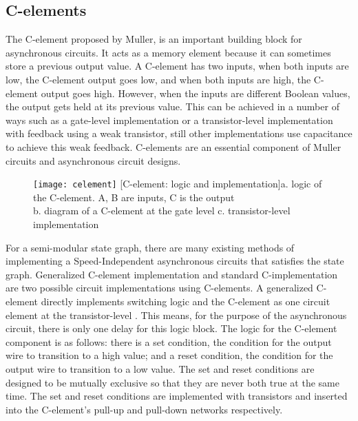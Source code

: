 \documentclass[12pt]{report}
\begin{document}
\subsection{C-elements}
The C-element proposed by Muller, is an important building block for asynchronous circuits. It acts as a memory element because it can sometimes store a previous output value.  A C-element has two inputs, when both inputs are low, the C-element output goes low, and when both inputs are high, the C-element output goes high.  However, when the inputs are different Boolean values, the output gets held at its previous value. This can be achieved in a number of ways such as a gate-level implementation or a transistor-level implementation with feedback using a weak transistor, still other implementations use capacitance to achieve this weak feedback.  C-elements are an essential component of Muller circuits and asynchronous circuit designs. \\
\begin{figure}
\texttt{[image: celement]}
[C-element: logic and implementation]{a. logic of the C-element. A, B are inputs, C is the output \\ b. diagram of a C-element at the gate level c. transistor-level implementation}
\end{figure}

For a semi-modular state graph, there are many existing methods of implementing a Speed-Independent asynchronous circuits that satisfies the state graph.  Generalized C-element implementation and standard C-implementation are two possible circuit implementations using C-elements.  
A generalized C-element directly implements switching logic and the C-element as one circuit element at the transistor-level \cite{myers_book_2004}.  This means, for the purpose of the asynchronous circuit, there is only one delay for this logic block.  The logic for the C-element component is as follows: there is a set condition, the condition for the output wire to transition to a high value; and a reset condition, the condition for the output wire to transition to a low value.  The set and reset conditions are designed to be mutually exclusive so that they are never both true at the same time.  The set and reset conditions are implemented with transistors and inserted into the C-element's pull-up and pull-down networks respectively.\\
\end{document}
